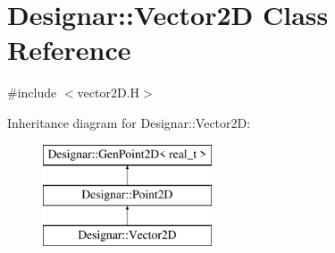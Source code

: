 \hypertarget{class_designar_1_1_vector2_d}{}\section{Designar\+:\+:Vector2D Class Reference}
\label{class_designar_1_1_vector2_d}


{\ttfamily \#include $<$vector2\+D.\+H$>$}

Inheritance diagram for Designar\+:\+:Vector2D\+:\begin{figure}[H]
\begin{center}
\leavevmode
\includegraphics[height=3.000000cm]{class_designar_1_1_vector2_d}
\end{center}
\end{figure}
